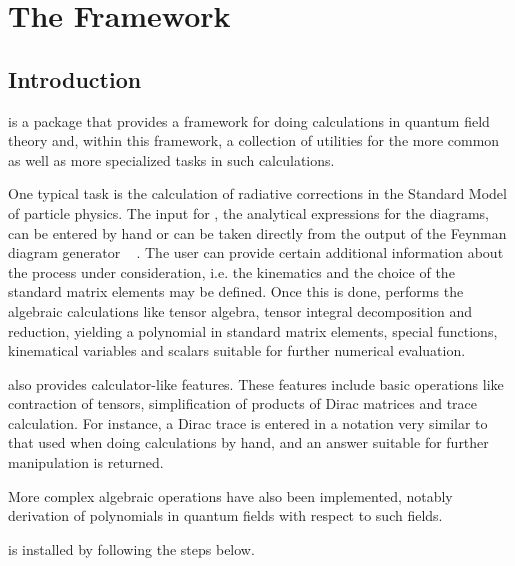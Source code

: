 \chapter{The \fc Framework}

\section{Introduction}
\label{intro}

\fc is a \mma package that provides a framework for doing calculations
in quantum field theory and, within this framework, a collection of utilities
for the more common as well as more specialized tasks
in such calculations.

One typical task is the calculation of
radiative corrections in the Standard Model of particle physics. 
The input for \fc, the analytical expressions for the diagrams, can be 
entered by hand or can be taken directly from the output of the Feynman diagram generator \fa\ \cite{feynarts} .
The user can provide certain additional  information about the process 
under consideration, i.e. the kinematics and the choice of the standard 
matrix elements may be defined. Once this is done, \fc performs the 
algebraic calculations like tensor algebra, tensor integral decomposition and reduction,
yielding a polynomial in standard matrix elements,  special functions, kinematical 
variables and scalars suitable for further numerical evaluation.

\fc also provides calculator-like features.
These features include basic operations like contraction of
tensors, simplification of products of Dirac matrices and trace calculation.
For instance, a Dirac trace is entered
in a notation very similar to that used when doing calculations by hand, and 
an answer suitable for further manipulation is returned.

More complex algebraic operations have also been implemented, notably derivation
of polynomials in quantum fields with respect to such fields.

\fc is installed by following the steps below.

